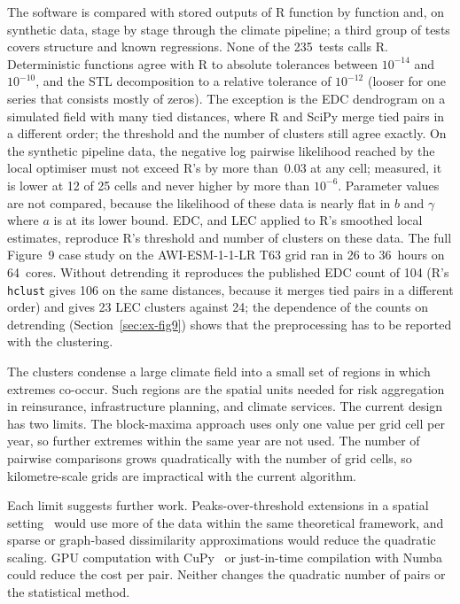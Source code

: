 \documentclass[preprint,12pt,a4paper]{elsarticle}
\newcommand{\revb}[1]{{#1}}
\newcommand{\revg}[1]{{#1}}
\newcommand{\revo}[1]{{#1}}
\begin{document}
\revg{The software is compared with stored outputs of R function by
function and, on synthetic data, stage by stage through the climate
pipeline; a third group of tests covers structure and known
regressions. None of the 235~tests calls R. Deterministic functions
agree with R to absolute tolerances between $10^{-14}$ and
$10^{-10}$, and the STL decomposition to a relative tolerance of
$10^{-12}$ (looser for one series that consists mostly of zeros).
The exception is the EDC dendrogram on a simulated field with many
tied distances, where R and SciPy merge tied pairs in a different
order; the threshold and the number of clusters still agree exactly.
On the synthetic pipeline data, the negative log pairwise likelihood
reached by the local optimiser must not exceed R's by more than~0.03
at any cell; measured, it is lower at 12 of 25 cells and never higher
by more than $10^{-6}$. Parameter values are not compared, because
the likelihood of these data is nearly flat in $b$ and $\gamma$
where $a$ is at its lower bound. EDC, and LEC applied to R's
smoothed local estimates, reproduce R's threshold and number of
clusters on these data. The full Figure~9
\revb{case study} on the AWI-ESM-1-1-LR T63 grid ran in 26 to 36~hours
on 64~cores. Without detrending it reproduces the published EDC count
of 104 (R's \texttt{hclust} gives 106 on the same distances, because
it merges tied pairs in a different order) and gives 23 LEC clusters
against 24; the dependence of the
counts on detrending (Section~\ref{sec:ex-fig9}) shows that the
preprocessing has to be reported with the clustering.}

\revg{The clusters condense a large climate field into a small set of
regions in which extremes co-occur. Such regions are the spatial units
needed for risk aggregation in reinsurance, infrastructure planning,
and climate services. The current design has two limits. The
block-maxima approach uses only one value per grid cell per year, so
further extremes within the same year are not used. The number of
pairwise comparisons grows quadratically with the number of grid
cells, so kilometre-scale grids are impractical with the current
algorithm.}

\revo{Each limit suggests further work. Peaks-over-threshold
extensions in a spatial setting~\cite{davison2012} would use more of
the data within the same theoretical framework, and sparse or
graph-based dissimilarity approximations would reduce the quadratic
scaling. GPU computation with CuPy~\cite{okuta2017} or just-in-time
compilation with Numba~\cite{lam2015} could reduce the cost per pair.
Neither changes the quadratic number of pairs or the statistical
method.}
\end{document}
